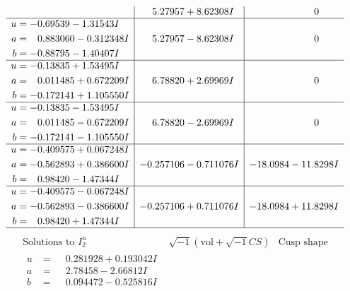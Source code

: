 \documentclass[1p]{elsarticle_modified}
\theoremstyle{definition}
\newcommand{\I}{\sqrt{-1}}
\begin{document}
$$\begin{array}{c|c|c}
 & \phantom{-}5.27957 + 8.62308 I & \phantom{-0.000000 } 0 \\ \hline\begin{aligned}
u &= -0.69539 - 1.31543 I \\
a &= \phantom{-}0.883060 - 0.312348 I \\
b &= -0.88795 - 1.40407 I\end{aligned}
 & \phantom{-}5.27957 - 8.62308 I & \phantom{-0.000000 } 0 \\ \hline\begin{aligned}
u &= -0.13835 + 1.53495 I \\
a &= \phantom{-}0.011485 + 0.672209 I \\
b &= -0.172141 + 1.105550 I\end{aligned}
 & \phantom{-}6.78820 + 2.69969 I & \phantom{-0.000000 } 0 \\ \hline\begin{aligned}
u &= -0.13835 - 1.53495 I \\
a &= \phantom{-}0.011485 - 0.672209 I \\
b &= -0.172141 - 1.105550 I\end{aligned}
 & \phantom{-}6.78820 - 2.69969 I & \phantom{-0.000000 } 0 \\ \hline\begin{aligned}
u &= -0.409575 + 0.067248 I \\
a &= -0.562893 + 0.386600 I \\
b &= \phantom{-}0.98420 - 1.47344 I\end{aligned}
 & -0.257106 - 0.711076 I & -18.0984 - 11.8298 I \\ \hline\begin{aligned}
u &= -0.409575 - 0.067248 I \\
a &= -0.562893 - 0.386600 I \\
b &= \phantom{-}0.98420 + 1.47344 I\end{aligned}
 & -0.257106 + 0.711076 I & -18.0984 + 11.8298 I\\
 \hline 
 \end{array}$$\newpage$$\begin{array}{c|c|c}  
\text{Solutions to }I^u_{2}& \I (\text{vol} + \sqrt{-1}CS) & \text{Cusp shape}\\
 \hline 
\begin{aligned}
u &= \phantom{-}0.281928 + 0.193042 I \\
a &= \phantom{-}2.78458 - 2.66812 I \\
b &= \phantom{-}0.094472 - 0.525816 I\end{aligned}

\end{array}$$
\end{document}
